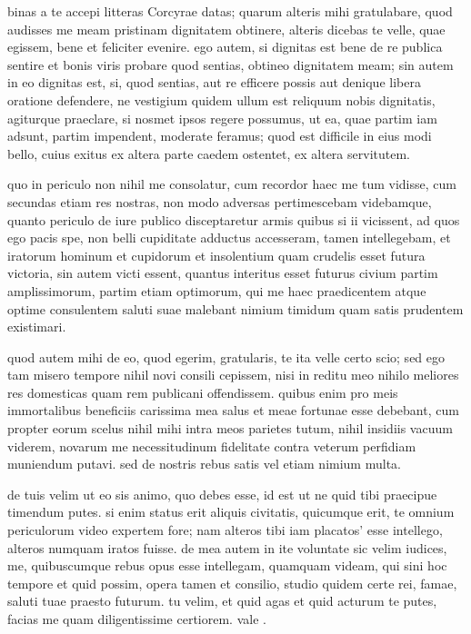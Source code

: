 


 binas a te accepi litteras Corcyrae datas; quarum alteris mihi gratulabare, quod audisses me meam pristinam dignitatem obtinere, alteris dicebas te velle, quae egissem, bene et feliciter evenire. ego autem, si dignitas est bene de re publica sentire et bonis viris probare quod sentias, obtineo dignitatem meam; sin autem in eo dignitas est, si, quod sentias, aut re efficere possis aut denique libera oratione defendere, ne vestigium quidem ullum est reliquum nobis dignitatis, agiturque praeclare, si nosmet ipsos regere possumus, ut ea, quae partim iam adsunt, partim impendent, moderate feramus; quod est difficile in eius modi bello, cuius exitus ex altera parte caedem ostentet, ex altera servitutem.

 quo in periculo non nihil me consolatur, cum recordor haec me tum vidisse, cum secundas etiam res nostras, non modo adversas pertimescebam videbamque, quanto periculo de iure publico disceptaretur armis quibus si ii vicissent, ad quos ego pacis spe, non belli cupiditate adductus accesseram, tamen intellegebam, et iratorum hominum et cupidorum et insolentium quam crudelis esset futura victoria, sin autem victi essent, quantus interitus esset futurus civium partim amplissimorum, partim etiam optimorum, qui me haec praedicentem atque optime consulentem saluti suae malebant nimium timidum quam satis prudentem existimari.

 quod autem mihi de eo, quod egerim, gratularis, te ita velle certo scio; sed ego tam misero tempore nihil novi consili cepissem, nisi in reditu meo nihilo meliores res domesticas quam rem publicani offendissem. quibus enim pro meis immortalibus beneficiis carissima mea salus et meae fortunae esse debebant, cum propter eorum scelus nihil mihi intra meos parietes tutum, nihil insidiis vacuum viderem, novarum me necessitudinum fidelitate contra veterum perfidiam muniendum putavi. sed de nostris rebus satis vel etiam nimium multa.

 de tuis velim ut eo sis animo, quo debes esse, id est ut ne quid tibi praecipue timendum putes. si enim status erit aliquis civitatis, quicumque erit, te omnium periculorum video expertem fore; nam alteros tibi iam placatos' esse intellego, alteros numquam iratos fuisse. de mea autem in ite voluntate sic velim iudices, me, quibuscumque rebus opus esse intellegam, quamquam videam, qui sini hoc tempore et quid possim, opera tamen et consilio, studio quidem certe rei, famae, saluti tuae praesto futurum. tu velim, et quid agas et quid acturum te putes, facias me quam diligentissime certiorem. vale .
